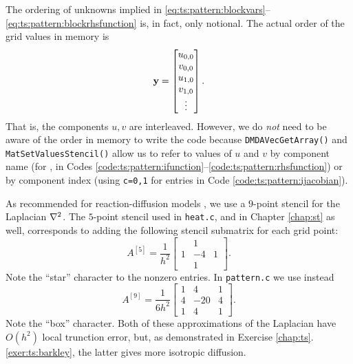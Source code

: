 
The ordering of unknowns implied in \eqref{eq:ts:pattern:blockvars}--\eqref{eq:ts:pattern:blockrhsfunction} is, in fact, only notional.  The actual order of the grid values in memory is
\begin{equation}
\mathbf{y} = \begin{bmatrix} u_{0,0} \\ v_{0,0} \\ u_{1,0} \\ v_{1,0} \\ \vdots \end{bmatrix}. \label{eq:ts:pattern:interleaved}
\end{equation}
That is, the components $u,v$ are interleaved.  However, we do \emph{not} need to be aware of the order in memory to write the code because \texttt{DMDAVecGetArray()} and \texttt{MatSetValuesStencil()} allow us to refer to values of $u$ and $v$ by component name (for \pVecs, in Codes \ref{code:ts:pattern:ifunction}--\ref{code:ts:pattern:rhsfunction}) or by component index (using \texttt{c=0,1} for \pMat entries in Code \ref{code:ts:pattern:ijacobian}).


As recommended for reaction-diffusion models \citep[section III.6]{HundsdorferVerwer2003}, we use a $9$-point stencil for the Laplacian $\nabla^2$.  The $5$-point stencil used in \texttt{heat.c}, and in Chapter \ref{chap:st} as well, corresponds to adding the following stencil submatrix for each grid point:
\begin{equation}
A^{[5]} = \frac{1}{h^2} \begin{bmatrix}
	 & 1 & \\
	1 & -4 & 1 \\
	  &  1 & 
	\end{bmatrix}.  \label{eq:ts:pattern:fivepoint}
\end{equation}
Note the ``star'' character to the nonzero entries.  In \texttt{pattern.c} we use instead
\begin{equation}
A^{[9]} = \frac{1}{6h^2} \begin{bmatrix}
	1 &   4 & 1\\
	4 & -20 & 4 \\
	1 &   4 & 1
	\end{bmatrix}.  \label{eq:ts:pattern:ninepoint}
\end{equation}
Note the ``box'' character.  Both of these approximations of the Laplacian have $O(h^2)$ local trunction error, but, as demonstrated in Exercise \ref{chap:ts}.\ref{exer:ts:barkley}, the latter gives more isotropic diffusion.

